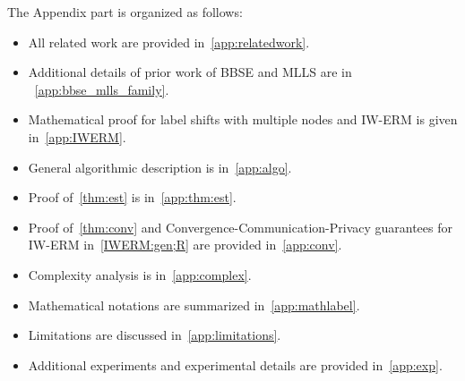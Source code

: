 The Appendix part is organized as follows: 
\begin{itemize}
    \item All related work are provided in~\cref{app:relatedwork}.
    \item Additional details of prior work of BBSE and MLLS are in ~\cref{app:bbse_mlls_family}.
    \item Mathematical proof for label shifts with multiple nodes and IW-ERM is given in~\cref{app:IWERM}.
    \item General algorithmic description is in~\cref{app:algo}.
    \item Proof of~\cref{thm:est} is in~\cref{app:thm:est}.
    \item  Proof of~\cref{thm:conv} and Convergence-Communication-Privacy guarantees for IW-ERM in~\cref{IWERM:gen;R} are provided in~\cref{app:conv}.
    \item Complexity analysis is in~\cref{app:complex}.
    \item Mathematical notations are summarized in~\cref{app:mathlabel}.
    \item Limitations are discussed in~\cref{app:limitations}.
    \item Additional experiments and experimental details are provided in~\cref{app:exp}.
    
\end{itemize}
\newpage

\newpage

\newpage

\newpage

\newpage

\newpage

\newpage

\newpage

\newpage

\newpage




